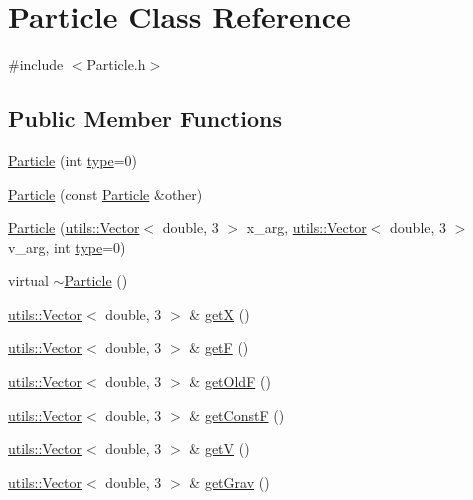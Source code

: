 \hypertarget{classParticle}{}\section{Particle Class Reference}
\label{classParticle}


{\ttfamily \#include $<$Particle.\+h$>$}

\subsection*{Public Member Functions}
\begin{DoxyCompactItemize}
\item 
\hyperlink{classParticle_a866812d3dfb9c539e5e24593e596a8c9}{Particle} (int \hyperlink{classtype}{type}=0)
\item 
\hyperlink{classParticle_a24b04cb7c6f7ea4242d25c410f44ae56}{Particle} (const \hyperlink{classParticle}{Particle} \&other)
\item 
\hyperlink{classParticle_a7e4fe63e27ca0f024f94c0f7ce84697b}{Particle} (\hyperlink{classutils_1_1Vector}{utils\+::\+Vector}$<$ double, 3 $>$ x\+\_\+arg, \hyperlink{classutils_1_1Vector}{utils\+::\+Vector}$<$ double, 3 $>$ v\+\_\+arg, int \hyperlink{classtype}{type}=0)
\item 
virtual \hyperlink{classParticle_ad030d0fe7b88cf81744b127c99244ff4}{$\sim$\+Particle} ()
\item 
\hyperlink{classutils_1_1Vector}{utils\+::\+Vector}$<$ double, 3 $>$ \& \hyperlink{classParticle_ab7ade5dc156dfa0234aa0323564e46ed}{getX} ()
\item 
\hyperlink{classutils_1_1Vector}{utils\+::\+Vector}$<$ double, 3 $>$ \& \hyperlink{classParticle_acd84c445e2bd5f5280a00e76cfe73fe0}{getF} ()
\item 
\hyperlink{classutils_1_1Vector}{utils\+::\+Vector}$<$ double, 3 $>$ \& \hyperlink{classParticle_a1204435fc08c697b0fea230616d1bbdf}{get\+OldF} ()
\item 
\hyperlink{classutils_1_1Vector}{utils\+::\+Vector}$<$ double, 3 $>$ \& \hyperlink{classParticle_add1f32d038d9fe65061168448b2b829e}{get\+ConstF} ()
\item 
\hyperlink{classutils_1_1Vector}{utils\+::\+Vector}$<$ double, 3 $>$ \& \hyperlink{classParticle_aaf3ecbc6e1e31b259fe239461ba13dbd}{getV} ()
\item 
\hyperlink{classutils_1_1Vector}{utils\+::\+Vector}$<$ double, 3 $>$ \& \hyperlink{classParticle_ac7ecd12061cccf37016558df2352329d}{get\+Grav} ()
\item 

\end{DoxyCompactItemize}
